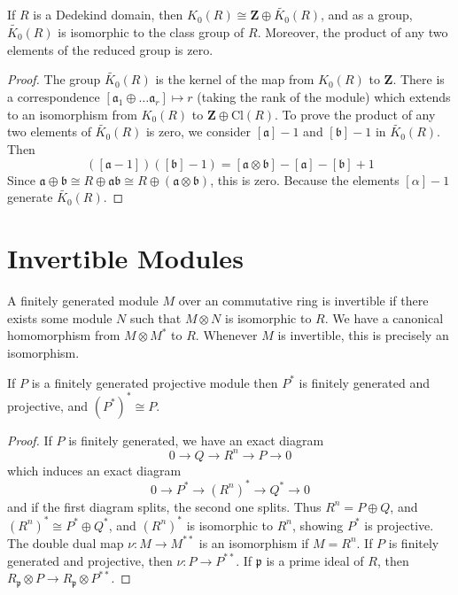 \begin{corollary}
    If $R$ is a Dedekind domain, then $K_0(R) \cong \mathbf{Z} \oplus \widetilde{K_0}(R)$, and as a group, $\widetilde{K_0}(R)$ is isomorphic to the class group of $R$. Moreover, the product of any two elements of the reduced group is zero.
\end{corollary}
\begin{proof}
    The group $\widetilde{K_0}(R)$ is the kernel of the map from $K_0(R)$ to $\mathbf{Z}$. There is a correspondence $[\mathfrak{a}_1 \oplus \dots \mathfrak{a}_r] \mapsto r$ (taking the rank of the module) which extends to an isomorphism from $K_0(R)$ to $\mathbf{Z} \oplus \text{Cl}(R)$. To prove the product of any two elements of $\tilde{K_0}(R)$ is zero, we consider $[\mathfrak{a}] - 1$ and $[\mathfrak{b}] - 1$ in $\tilde{K_0}(R)$. Then
    \[ ([\mathfrak{a} - 1])([\mathfrak{b}] - 1) = [\mathfrak{a} \otimes \mathfrak{b}] - [\mathfrak{a}] - [\mathfrak{b}] + 1 \]
    Since $\mathfrak{a} \oplus \mathfrak{b} \cong R \oplus \mathfrak{a} \mathfrak{b} \cong R \oplus (\mathfrak{a} \otimes \mathfrak{b})$, this is zero. Because the elements $[\mathfrak{\alpha}] - 1$ generate $\tilde{K_0}(R)$.
\end{proof}

\section{Invertible Modules}

A finitely generated module $M$ over an commutative ring is invertible if there exists some module $N$ such that $M \otimes N$ is isomorphic to $R$. We have a canonical homomorphism from $M \otimes M^*$ to $R$. Whenever $M$ is invertible, this is precisely an isomorphism.

\begin{lemma}
    If $P$ is a finitely generated projective module then $P^*$ is finitely generated and projective, and $(P^*)^* \cong P$.
\end{lemma}
\begin{proof}
    If $P$ is finitely generated, we have an exact diagram
    \[ 0 \to Q \to R^n \to P \to 0 \]
    which induces an exact diagram
    \[ 0 \to P^* \to (R^n)^* \to Q^* \to 0 \]
    and if the first diagram splits, the second one splits. Thus $R^n = P \oplus Q$, and $(R^n)^* \cong P^* \oplus Q^*$, and $(R^n)^*$ is isomorphic to $R^n$, showing $P^*$ is projective. The double dual map $\nu: M \to M^{**}$ is an isomorphism if $M = R^n$. If $P$ is finitely generated and projective, then $\nu: P \to P^{**}$. If $\mathfrak{p}$ is a prime ideal of $R$, then $R_{\mathfrak{p}} \otimes P \to R_{\mathfrak{p}} \otimes P^{**}$.
\end{proof}

